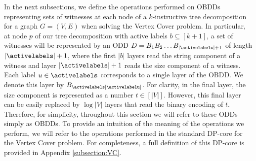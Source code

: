 In the next subsections, we define the operations performed on OBDDs representing sets of witnesses at each node of a $k$-instructive tree decomposition for a graph $G = (V,E)$ when solving the {\sc Vertex Cover} problem.
In particular, at node $p$ of our tree decomposition with active labels $b\subseteq [k+1]$, a set of witnesses will be represented by an ODD $D = B_1B_2\ldots B_{|\activelabels|+1}$ of length $|\activelabels|+1$, where the first $|b|$ layers read the string component of a witness and layer $|\activelabels|+1$ reads the size component of a witness. Each label $u\in \activelabels$ corresponds to a single layer of the OBDD. We denote this layer by $B_{\activelabels[\activelabelu]}$. For clarity, in the final layer, the size component is represented as a number $t\in [|V|]$. However, this final layer can be easily replaced by $\log |V|$ layers that read the binary encoding of $t$. Therefore, for simplicity, throughout this section we will refer to these ODDs simply as OBDDs. 
To provide an intuition of the meaning of the operations we perform, we will refer to the operations performed in the standard DP-core for the {\sc Vertex Cover} problem. For completeness, a full definition of this DP-core is provided in Appendix \ref{subsection:VC}.

